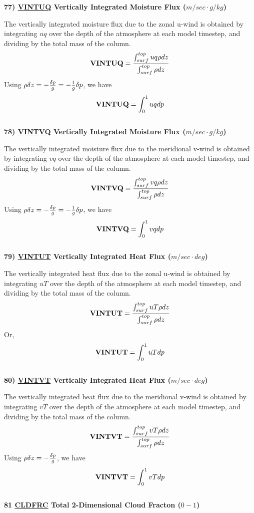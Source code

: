 \noindent
{\bf 77)  \underline {VINTUQ} Vertically Integrated Moisture Flux ($m/sec \cdot g/kg$) }

\noindent
The vertically integrated moisture flux due to the zonal u-wind is obtained by integrating
$u q$ over the depth of the atmosphere at each model timestep, 
and dividing by the total mass of the column.
\[
{\bf VINTUQ} = \frac{ \int_{surf}^{top} u q \rho dz  } { \int_{surf}^{top} \rho dz  }
\]
Using $\rho \delta z = -{\delta p \over g} = - {1 \over g} \delta p$, we have 
\[
{\bf VINTUQ} = { \int_0^1 u q dp  }
\]
\\


\noindent
{\bf 78)  \underline {VINTVQ} Vertically Integrated Moisture Flux ($m/sec \cdot g/kg$) }

\noindent
The vertically integrated moisture flux due to the meridional v-wind is obtained by integrating
$v q$ over the depth of the atmosphere at each model timestep, 
and dividing by the total mass of the column.
\[
{\bf VINTVQ} = \frac{ \int_{surf}^{top} v q \rho dz  } { \int_{surf}^{top} \rho dz  }
\]
Using $\rho \delta z = -{\delta p \over g} = - {1 \over g} \delta p$, we have 
\[
{\bf VINTVQ} = { \int_0^1 v q dp  }
\]
\\


\noindent
{\bf 79)  \underline {VINTUT} Vertically Integrated Heat Flux ($m/sec \cdot deg$) }

\noindent
The vertically integrated heat flux due to the zonal u-wind is obtained by integrating
$u T$ over the depth of the atmosphere at each model timestep, 
and dividing by the total mass of the column.
\[
{\bf VINTUT} = \frac{ \int_{surf}^{top} u T \rho dz  } { \int_{surf}^{top} \rho dz  }
\]
Or,
\[
{\bf VINTUT} = { \int_0^1 u T dp  }
\]
\\

\noindent
{\bf 80)  \underline {VINTVT} Vertically Integrated Heat Flux ($m/sec \cdot deg$) }

\noindent
The vertically integrated heat flux due to the meridional v-wind is obtained by integrating
$v T$ over the depth of the atmosphere at each model timestep, 
and dividing by the total mass of the column.
\[
{\bf VINTVT} = \frac{ \int_{surf}^{top} v T \rho dz  } { \int_{surf}^{top} \rho dz  }
\]
Using $\rho \delta z = -{\delta p \over g} $, we have 
\[
{\bf VINTVT} = { \int_0^1 v T dp  }
\]
\\

\noindent
{\bf 81 \underline {CLDFRC} Total 2-Dimensional Cloud Fracton ($0-1$) }

